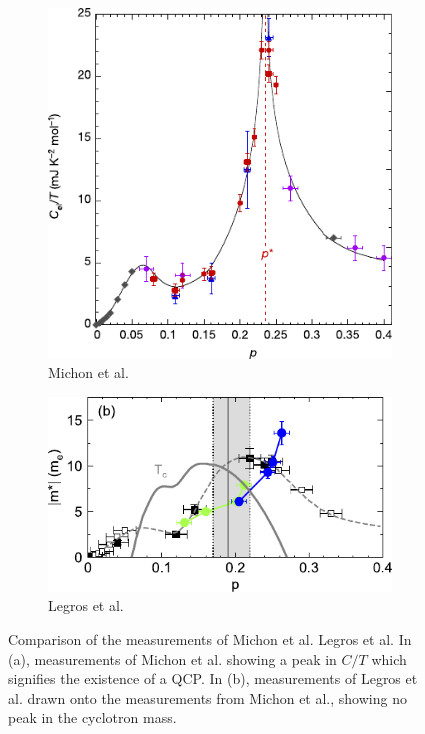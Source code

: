 \begin{figure}
    \centering
    \begin{subfigure}{0.48\textwidth}
        \centering
        \includegraphics[width=\textwidth]{figures/michon}
        \caption{Michon et al.\cite{michon2019}}
        \label{fig:michon}
    \end{subfigure}\hfill
    \begin{subfigure}{0.48\textwidth}
        \centering
        \includegraphics[width=\textwidth]{figures/legros}
        \caption{Legros et al.\cite{legros2022}}
        \label{fig:legros}
    \end{subfigure}
    \caption{Comparison of the measurements of Michon et al. Legros et al. In (a), measurements
    of Michon et al. showing a peak in $C/T$ which signifies the existence of a QCP. In (b),
    measurements of Legros et al. drawn onto the measurements from Michon et al.,
    showing no peak in the cyclotron mass.}
    \label{fig:comparison}
\end{figure}

